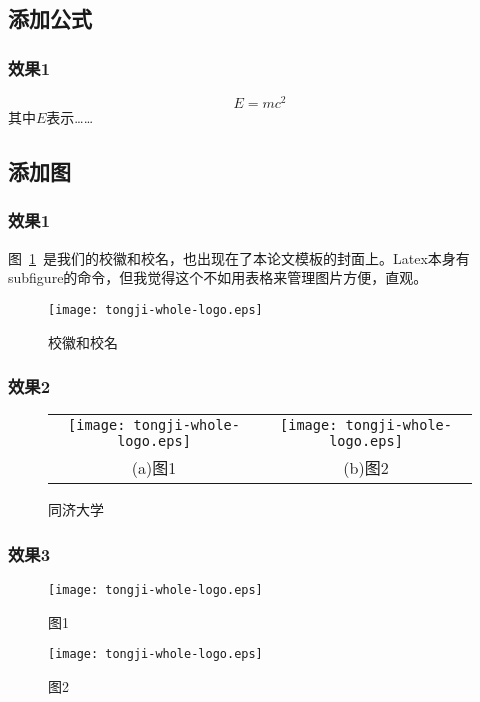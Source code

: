 \subsection{添加公式}

\subsubsection{效果1}

\begin{equation}
	E = m c^2
\end{equation}
其中$E$表示……

\subsection{添加图}

\subsubsection{效果1}

图~\ref{fig:logo}~是我们的校徽和校名，也出现在了本论文模板的封面上。Latex本身有subfigure的命令，但我觉得这个不如用表格来管理图片方便，直观。

\begin{figure}[htb!]
	\centering
	\texttt{[image: tongji-whole-logo.eps]}
	\caption{校徽和校名}
	\label{fig:logo}
\end{figure}

\subsubsection{效果2}

\begin{figure}[htb!] 
	\centering 
	\begin{tabular}{cc} 
		\texttt{[image: tongji-whole-logo.eps]} & \texttt{[image: tongji-whole-logo.eps]}\\ 
		(a)图1 & (b)图2
	\end{tabular} 
	\caption{同济大学} 
	\label{fig:subimage} 
\end{figure}

\subsubsection{效果3}

\begin{figure}[htb!] 
	\noindent 
	\begin{minipage}[t]{.48\linewidth} 
		\centering 
			\texttt{[image: tongji-whole-logo.eps]} 
		\caption{图1} 
		\label{fig:quadratic} 
	\end{minipage} 
	\begin{minipage}[t]{.48\linewidth} 
		\centering 
		\texttt{[image: tongji-whole-logo.eps]} 
			\caption{图2} 
		\label{fig:triorder} 
	\end{minipage} 
\end{figure}

